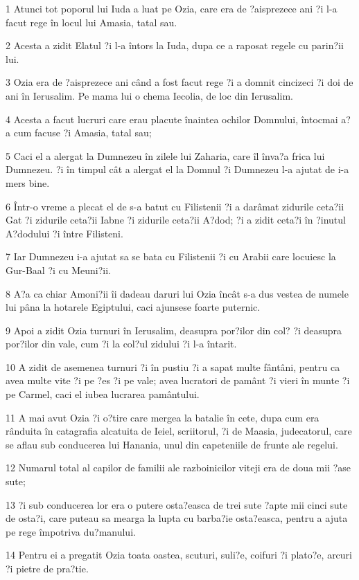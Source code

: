 \par 1 Atunci tot poporul lui Iuda a luat pe Ozia, care era de ?aisprezece ani ?i l-a facut rege în locul lui Amasia, tatal sau.
\par 2 Acesta a zidit Elatul ?i l-a întors la Iuda, dupa ce a raposat regele cu parin?ii lui.
\par 3 Ozia era de ?aisprezece ani când a fost facut rege ?i a domnit cincizeci ?i doi de ani în Ierusalim. Pe mama lui o chema Iecolia, de loc din Ierusalim.
\par 4 Acesta a facut lucruri care erau placute înaintea ochilor Domnului, întocmai a?a cum facuse ?i Amasia, tatal sau;
\par 5 Caci el a alergat la Dumnezeu în zilele lui Zaharia, care îl înva?a frica lui Dumnezeu. ?i în timpul cât a alergat el la Domnul ?i Dumnezeu l-a ajutat de i-a mers bine.
\par 6 Într-o vreme a plecat el de s-a batut cu Filistenii ?i a darâmat zidurile ceta?ii Gat ?i zidurile ceta?ii Iabne ?i zidurile ceta?ii A?dod; ?i a zidit ceta?i în ?inutul A?dodului ?i între Filisteni.
\par 7 Iar Dumnezeu i-a ajutat sa se bata cu Filistenii ?i cu Arabii care locuiesc la Gur-Baal ?i cu Meuni?ii.
\par 8 A?a ca chiar Amoni?ii îi dadeau daruri lui Ozia încât s-a dus vestea de numele lui pâna la hotarele Egiptului, caci ajunsese foarte puternic.
\par 9 Apoi a zidit Ozia turnuri în Ierusalim, deasupra por?ilor din col? ?i deasupra por?ilor din vale, cum ?i la col?ul zidului ?i l-a întarit.
\par 10 A zidit de asemenea turnuri ?i în pustiu ?i a sapat multe fântâni, pentru ca avea multe vite ?i pe ?es ?i pe vale; avea lucratori de pamânt ?i vieri în munte ?i pe Carmel, caci el iubea lucrarea pamântului.
\par 11 A mai avut Ozia ?i o?tire care mergea la batalie în cete, dupa cum era rânduita în catagrafia alcatuita de Ieiel, scriitorul, ?i de Maasia, judecatorul, care se aflau sub conducerea lui Hanania, unul din capeteniile de frunte ale regelui.
\par 12 Numarul total al capilor de familii ale razboinicilor viteji era de doua mii ?ase sute;
\par 13 ?i sub conducerea lor era o putere osta?easca de trei sute ?apte mii cinci sute de osta?i, care puteau sa mearga la lupta cu barba?ie osta?easca, pentru a ajuta pe rege împotriva du?manului.
\par 14 Pentru ei a pregatit Ozia toata oastea, scuturi, suli?e, coifuri ?i plato?e, arcuri ?i pietre de pra?tie.
